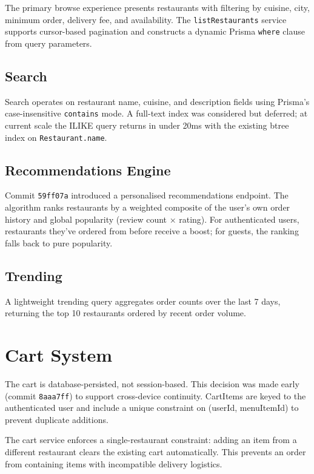 \documentclass[11pt,a4paper,twoside]{book}
\begin{document}
The primary browse experience presents restaurants with filtering by cuisine,
city, minimum order, delivery fee, and availability.  The \texttt{listRestaurants}
service supports cursor-based pagination and constructs a dynamic Prisma
\texttt{where} clause from query parameters.

\subsection{Search}

Search operates on restaurant name, cuisine, and description fields using
Prisma's case-insensitive \texttt{contains} mode.  A full-text index was
considered but deferred; at current scale the ILIKE query returns in under 20ms
with the existing btree index on \texttt{Restaurant.name}.

\subsection{Recommendations Engine}

Commit \texttt{59ff07a} introduced a personalised recommendations endpoint.
The algorithm ranks restaurants by a weighted composite of the user's own order
history and global popularity (review count × rating).  For authenticated users,
restaurants they've ordered from before receive a boost; for guests, the ranking
falls back to pure popularity.

\subsection{Trending}

A lightweight trending query aggregates order counts over the last 7 days,
returning the top 10 restaurants ordered by recent order volume.

\section{Cart System}

The cart is database-persisted, not session-based.  This decision was made
early (commit \texttt{8aaa7ff}) to support cross-device continuity.  CartItems
are keyed to the authenticated user and include a unique constraint on
(userId, menuItemId) to prevent duplicate additions.

\begin{tcolorbox}[warn,title=Cart Cross-Restaurant Guard]
The cart service enforces a single-restaurant constraint: adding an item from
a different restaurant clears the existing cart automatically.  This prevents
an order from containing items with incompatible delivery logistics.
\end{tcolorbox}
\end{document}
